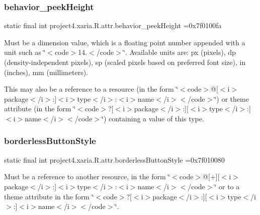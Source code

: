 \subsubsection{\texorpdfstring{behavior\+\_\+peek\+Height}{behavior\_peekHeight}}
{\footnotesize\ttfamily static final int project4.\+xaria.\+R.\+attr.\+behavior\+\_\+peek\+Height =0x7f0100fa\hspace{0.3cm}{\ttfamily [static]}}

Must be a dimension value, which is a floating point number appended with a unit such as \char`\"{}$<$code$>$14.\+5sp$<$/code$>$\char`\"{}. Available units are\+: px (pixels), dp (density-\/independent pixels), sp (scaled pixels based on preferred font size), in (inches), mm (millimeters). 

This may also be a reference to a resource (in the form \char`\"{}$<$code$>$@\mbox{[}$<$i$>$package$<$/i$>$\+:\mbox{]}$<$i$>$type$<$/i$>$\+:$<$i$>$name$<$/i$>$$<$/code$>$\char`\"{}) or theme attribute (in the form \char`\"{}$<$code$>$?\mbox{[}$<$i$>$package$<$/i$>$\+:\mbox{]}\mbox{[}$<$i$>$type$<$/i$>$\+:\mbox{]}$<$i$>$name$<$/i$>$$<$/code$>$\char`\"{}) containing a value of this type. \mbox{\label{classproject4_1_1xaria_1_1R_1_1attr_acfd93ffef2c94e2f3c2b9922c3c04ef9}} 
\subsubsection{\texorpdfstring{borderless\+Button\+Style}{borderlessButtonStyle}}
{\footnotesize\ttfamily static final int project4.\+xaria.\+R.\+attr.\+borderless\+Button\+Style =0x7f010080\hspace{0.3cm}{\ttfamily [static]}}

Must be a reference to another resource, in the form \char`\"{}$<$code$>$@\mbox{[}+\mbox{]}\mbox{[}$<$i$>$package$<$/i$>$\+:\mbox{]}$<$i$>$type$<$/i$>$\+:$<$i$>$name$<$/i$>$$<$/code$>$\char`\"{} or to a theme attribute in the form \char`\"{}$<$code$>$?\mbox{[}$<$i$>$package$<$/i$>$\+:\mbox{]}\mbox{[}$<$i$>$type$<$/i$>$\+:\mbox{]}$<$i$>$name$<$/i$>$$<$/code$>$\char`\"{}. \mbox{\label{classproject4_1_1xaria_1_1R_1_1attr_aaec248df20502e6356eb4de802b96e5e}} 
